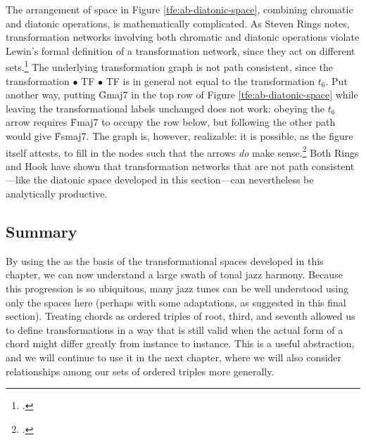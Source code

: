 The arrangement of \tf space in Figure \ref{tfe:ab-diatonic-space}, combining
chromatic and diatonic operations, is mathematically complicated. As Steven
Rings notes, transformation networks involving both chromatic and diatonic
operations violate Lewin's formal definition of a transformation network,
since they act on different sets.\footcite[98--99]{rings:2011} The underlying
transformation graph is not path consistent, since the transformation \slideS
$\bullet$ TF $\bullet$ TF is in general not equal to the transformation
$t_6$. Put another way, putting \h{Gmaj7} in the top row of Figure
\ref{tfe:ab-diatonic-space} while leaving the transformational labels
unchanged does not work: obeying the $t_6$ arrow requires \h{Fmaj7} to occupy
the row below, but following the other path would give \h{Fsmaj7}. The graph
is, however, realizable: it is possible, as the figure itself attests, to fill
in the nodes such that the arrows \emph{do} make
sense.\footcite[29]{hook:2007} Both Rings and Hook have shown that
transformation networks that are not path consistent---like the diatonic \tf
space developed in this section---can nevertheless be analytically productive.

\subsection{Summary}

By using the \tfo as the basis of the transformational spaces developed in
this chapter, we can now understand a large swath of tonal jazz harmony.
Because this progression is so ubiquitous, many jazz tunes can be well
understood using only the spaces here (perhaps with some adaptations, as
suggested in this final section). Treating chords as ordered triples of root,
third, and seventh allowed us to define transformations in a way that is still
valid when the actual form of a chord might differ greatly from instance to
instance. This is a useful abstraction, and we will continue to use it in the
next chapter, where we will also consider relationships among our sets of
ordered triples more generally.


